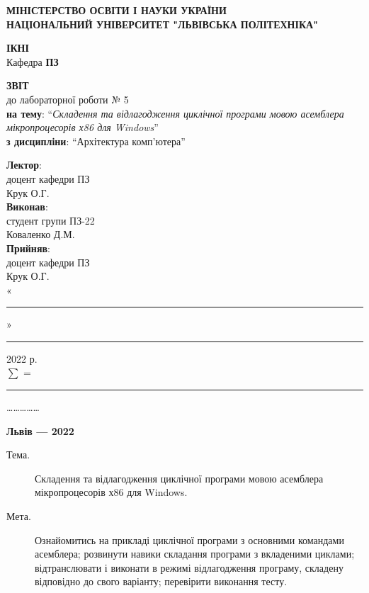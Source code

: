 \documentclass{article}
\newcommand\subject{Архітектура комп'ютера}
\newcommand\lecturer{доцент кафедри ПЗ\\Крук О.Г.}
\newcommand\teacher{доцент кафедри ПЗ\\Крук О.Г.}
\newcommand\mygroup{ПЗ-22}
\newcommand\lab{5}
\newcommand\theme{Складення та відлагодження циклічної програми мовою асемблера мікропроцесорів х86 для Windows}
\newcommand\purpose{Ознайомитись на прикладі циклічної програми з основними командами асемблера; розвинути навики складання програми з вкладеними циклами; відтранслювати і виконати в режимі відлагодження програму, складену відповідно до свого варіанту; перевірити виконання тесту}
\begin{document}
\begin{normalsize}
	\begin{titlepage}
		\thispagestyle{empty}
		\begin{center}
			\textbf{МІНІСТЕРСТВО ОСВІТИ І НАУКИ УКРАЇНИ\\
				НАЦІОНАЛЬНИЙ УНІВЕРСИТЕТ "ЛЬВІВСЬКА ПОЛІТЕХНІКА"}
		\end{center}
		\begin{flushright}
			\textbf{ІКНІ}\\
			Кафедра \textbf{ПЗ}
		\end{flushright}
		\vspace{200pt}
		\begin{center}
			\textbf{ЗВІТ}\\
			\vspace{10pt}
			до лабораторної роботи № \lab\\
			\textbf{на тему}: “\textit{\theme}”\\
			\textbf{з дисципліни}: “\subject”
		\end{center}
		\vspace{112pt}
		\begin{flushright}
			
			\textbf{Лектор}:\\
			\lecturer\\
			\vspace{28pt}
			\textbf{Виконав}:\\
			
			студент групи \mygroup\\
			Коваленко Д.М.\\
			\vspace{28pt}
			\textbf{Прийняв}:\\
			
			\teacher\\
			
			\vspace{28pt}
			«\rule{1cm}{0.15mm}» \rule{1.5cm}{0.15mm} 2022 р.\\
			$\sum$ = \rule{1cm}{0.15mm}……………\\
			
		\end{flushright}
		\vspace{\fill}
		\begin{center}
			\textbf{Львів — 2022}
		\end{center}
	\end{titlepage}
		
	\begin{description}
		\item[Тема.] \theme.
		\item[Мета.] \purpose.
	\end{description}


\end{normalsize}
\end{document}
